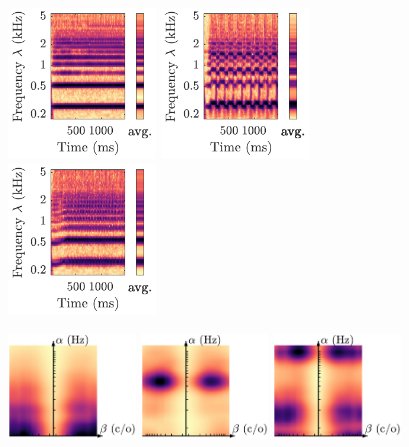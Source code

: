 \documentclass{bmcart}
\begin{document}
\begin{backmatter}
\begin{figure}
\includegraphics[height=4cm]{Fl-ord-C4-mf_scalogram.pdf}
\hspace{8mm}
\includegraphics[trim=35 0 0 0, clip, height=4cm]{Fl-trill-maj2-C4-mf_scalogram.pdf}
\hspace{12mm}
\includegraphics[trim=35 0 0 0, clip, height=4cm]{Fl-ply+sng-Csharp4+C4-mf_scalogram.pdf}

\hspace{2mm}
\includegraphics[height=28mm]{Fl-ord-C4-mf_scattering.pdf}
\hspace{5mm}
\includegraphics[height=28mm]{Fl-trill-maj2-C4-mf_scattering.pdf}
\hspace{5mm}
\includegraphics[trim=0 0 77 0, clip, height=28mm]{Fl-ply+sng-Csharp4+C4-mf_scattering.pdf}


\end{figure}
\end{backmatter}
\end{document}
